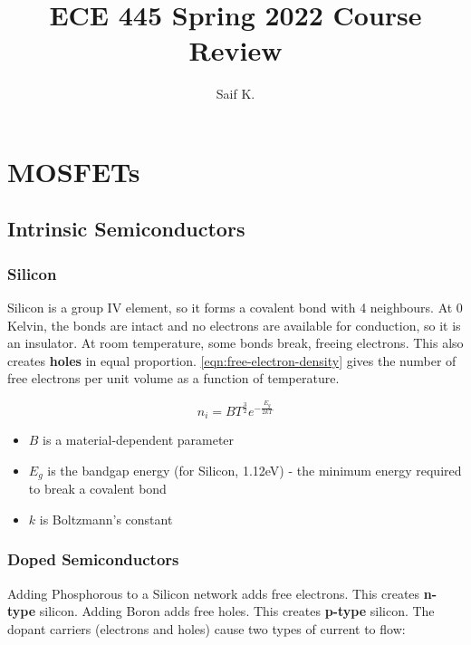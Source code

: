 \documentclass[11pt]{report}
\title{ECE 445 Spring 2022 Course Review}
\author{Saif K.}
\begin{document}
\maketitle

\setcounter{chapter}{-1}

\chapter{MOSFETs}

\section{Intrinsic Semiconductors}

\subsection{Silicon}

Silicon is a group IV element, so it forms a covalent bond with 4 neighbours. At 0 Kelvin, the bonds are intact and no electrons are available for conduction, so it is an insulator. At room temperature, some bonds break, freeing electrons. This also creates \textbf{holes} in equal proportion. \autoref{eqn:free-electron-density} gives the number of free electrons per unit volume as a function of temperature.


\begin{equation}
	\label{eqn:free-electron-density}
	n_i = BT^{\frac{3}{2}}e^{-\frac{E_g}{2kT}}
\end{equation}

\begin{itemize}
	\item $B$ is a material-dependent parameter
	\item $E_g$ is the bandgap energy (for Silicon, 1.12eV) - the minimum energy required to break a covalent bond
	\item $k$ is Boltzmann's constant
\end{itemize}

\subsection{Doped Semiconductors}

Adding Phosphorous to a Silicon network adds free electrons. This creates \textbf{n-type} silicon. Adding Boron adds free holes. This creates \textbf{p-type} silicon. The dopant carriers (electrons and holes) cause two types of current to flow:
\end{document}
